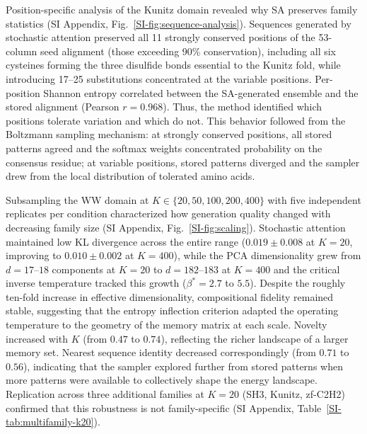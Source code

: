 \documentclass[11pt,onecolumn,twoside,lineno]{pnas-new}
\begin{document}
Position-specific analysis of the Kunitz domain revealed why SA preserves family statistics (SI Appendix, Fig.~\ref{SI-fig:sequence-analysis}). Sequences generated by stochastic attention preserved all 11 strongly conserved positions of the 53-column seed alignment (those exceeding 90\% conservation), including all six cysteines forming the three disulfide bonds essential to the Kunitz fold, while introducing 17--25 substitutions concentrated at the variable positions. Per-position Shannon entropy correlated between the SA-generated ensemble and the stored alignment (Pearson $r{=}0.968$). Thus, the method identified which positions tolerate variation and which do not. This behavior followed from the Boltzmann sampling mechanism: at strongly conserved positions, all stored patterns agreed and the softmax weights concentrated probability on the consensus residue; at variable positions, stored patterns diverged and the sampler drew from the local distribution of tolerated amino acids.

Subsampling the WW domain at $K \in \{20, 50, 100, 200, 400\}$ with five independent replicates per condition characterized how generation quality changed with decreasing family size (SI Appendix, Fig.~\ref{SI-fig:scaling}). Stochastic attention maintained low KL divergence across the entire range ($0.019 \pm 0.008$ at $K{=}20$, improving to $0.010 \pm 0.002$ at $K{=}400$), while the PCA dimensionality grew from $d{=}17$--$18$ components at $K{=}20$ to $d{=}182$--$183$ at $K{=}400$ and the critical inverse temperature tracked this growth ($\beta^*{=}2.7$ to $5.5$). Despite the roughly ten-fold increase in effective dimensionality, compositional fidelity remained stable, suggesting that the entropy inflection criterion adapted the operating temperature to the geometry of the memory matrix at each scale. Novelty increased with $K$ (from $0.47$ to $0.74$), reflecting the richer landscape of a larger memory set. Nearest sequence identity decreased correspondingly (from $0.71$ to $0.56$), indicating that the sampler explored further from stored patterns when more patterns were available to collectively shape the energy landscape. Replication across three additional families at $K{=}20$ (SH3, Kunitz, zf-C2H2) confirmed that this robustness is not family-specific (SI Appendix, Table~\ref{SI-tab:multifamily-k20}).
\end{document}
